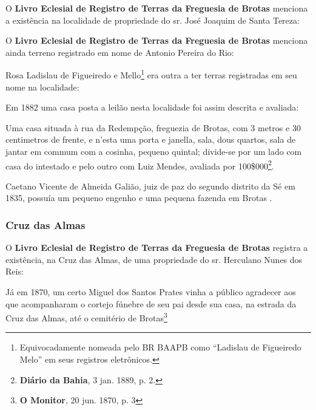 O \textbf{Livro Eclesial de Registro de Terras da Freguesia de Brotas} menciona a existência na localidade de propriedade do sr. José Joaquim de Santa Tereza:



O \textbf{Livro Eclesial de Registro de Terras da Freguesia de Brotas} menciona ainda terreno registrado em nome de Antonio Pereira do Rio:



Rosa Ladislau de Figueiredo e Mello\footnote{Equivocadamente nomeada pelo BR BAAPB como ``Ladislau de Figueiredo Melo'' em seus registros eletrônicos.} era outra a ter terras registradas em seu nome na localidade:




Em 1882 uma casa posta a leilão nesta localidade foi assim descrita e avaliada:

\begin{citacao}
Uma casa situada à rua da Redempção, freguezia de Brotas, com 3 metros e 30 centimetros de frente, e n'esta uma porta e janella, sala, dous quartos, sala de jantar em commum com a cosinha, pequeno quintal; divide-se por um lado com casa do intestado e pelo outro com Luiz Mendes, avaliada por 100\$000\footnote{\textbf{Diário da Bahia}, 3 jan. 1889, p. 2.}.
\end{citacao}



Caetano Vicente de Almeida Galião, juiz de paz do segundo distrito da Sé em 1835, possuía um pequeno engenho e uma pequena fazenda em Brotas \cite[p.~239]{REIS2004males}.

\subsubsection{Cruz das Almas}

O \textbf{Livro Eclesial de Registro de Terras da Freguesia de Brotas} registra a existência, na Cruz das Almas, de uma propriedade do sr. Herculano Nunes dos Reis:



Já em 1870, um certo Miguel dos Santos Prates vinha a público agradecer aos que acompanharam o cortejo fúnebre de seu pai desde sua casa, na estrada da Cruz das Almas, até o cemitério de Brotas\footnote{\textbf{O Monitor}, 20 jun. 1870, p. 3}

